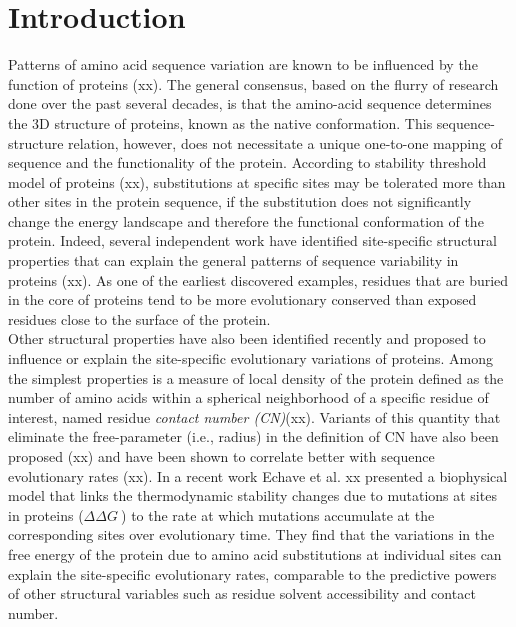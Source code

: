\documentclass[11pt]{article}
\newcommand{\ddg}{$\Delta\Delta G~$}
\begin{document}
\section{Introduction}
\label{sec:intro}

    Patterns of amino acid sequence variation are known to be influenced by the function of proteins (xx). The general consensus, based on the flurry of research done over the past several decades, is that the amino-acid sequence determines the 3D structure of proteins, known as the native conformation. This sequence-structure relation, however, does not necessitate a unique one-to-one mapping of sequence and the functionality of the protein. According to stability threshold model of proteins (xx), substitutions at specific sites may be tolerated more than other sites in the protein sequence, if the substitution does not significantly change the energy landscape and therefore the functional conformation of the protein. Indeed, several independent work have identified site-specific structural properties that can explain the general patterns of sequence variability in proteins (xx). As one of the earliest discovered examples, residues that are buried in the core of proteins tend to be more evolutionary conserved than exposed residues close to the surface of the protein.
    \\

    Other structural properties have also been identified recently and proposed to influence or explain the site-specific evolutionary variations of proteins. Among the simplest properties is a measure of local density of the protein defined as the number of amino acids within a spherical neighborhood of a specific residue of interest, named residue {\it contact number (CN)}(xx). Variants of this quantity that eliminate the free-parameter (i.e., radius) in the definition of CN have also been proposed (xx) and have been shown to correlate better with sequence evolutionary rates (xx). In a recent work Echave et al. xx presented a biophysical model that links the thermodynamic stability changes due to mutations at sites in proteins (\ddg) to the rate at which mutations accumulate at the corresponding sites over evolutionary time. They find that the variations in the free energy of the protein due to amino acid substitutions at individual sites can explain the site-specific evolutionary rates, comparable to the predictive powers of other structural variables such as residue solvent accessibility and contact number.
    \\
\end{document}
